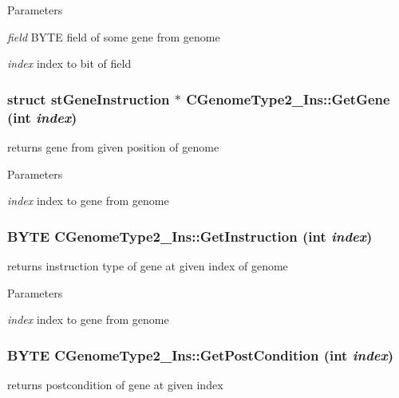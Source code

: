 \begin{DoxyParams}{Parameters}
\item[{\em field}]BYTE field of some gene from genome \item[{\em index}]index to bit of field \end{DoxyParams}
\hypertarget{classCGenomeType2__Ins_a07d84d4a76655fd529fabb16037d4304}{
\subsubsection[{GetGene}]{\setlength{\rightskip}{0pt plus 5cm}struct {\bf stGeneInstruction} $\ast$ CGenomeType2\_\-Ins::GetGene (int {\em index})}}
\label{classCGenomeType2__Ins_a07d84d4a76655fd529fabb16037d4304}
returns gene from given position of genome


\begin{DoxyParams}{Parameters}
\item[{\em index}]index to gene from genome \end{DoxyParams}
\hypertarget{classCGenomeType2__Ins_ab61bdf996674a2d443cc4a14d4b19f47}{
\subsubsection[{GetInstruction}]{\setlength{\rightskip}{0pt plus 5cm}BYTE CGenomeType2\_\-Ins::GetInstruction (int {\em index})}}
\label{classCGenomeType2__Ins_ab61bdf996674a2d443cc4a14d4b19f47}
returns instruction type of gene at given index of genome


\begin{DoxyParams}{Parameters}
\item[{\em index}]index to gene from genome \end{DoxyParams}
\hypertarget{classCGenomeType2__Ins_acf4f290bc5866b175232d467664260ef}{
\subsubsection[{GetPostCondition}]{\setlength{\rightskip}{0pt plus 5cm}BYTE CGenomeType2\_\-Ins::GetPostCondition (int {\em index})}}
\label{classCGenomeType2__Ins_acf4f290bc5866b175232d467664260ef}
returns postcondition of gene at given index


